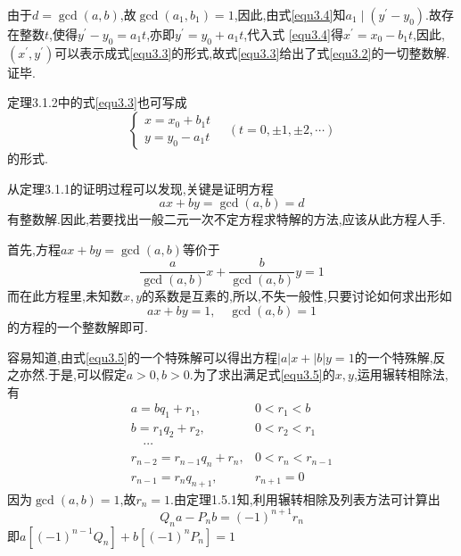 由于$d=\operatorname{gcd}(a, b)$,故$\operatorname{gcd}\left(a_{1}, b_{1}\right)=1$,因此,由式\eqref{equ3.4}知$a_{1} \mid\left(y^{\prime}-y_{0}\right)$.故存在整数$t$,使得$y^{\prime}-y_{0}=a_{1} t$,亦即$y^{\prime}=y_{0}+a_{1} t$,代入式 \eqref{equ3.4}得$x^{\prime}=x_{0}-b_{1} t$,因此,$\left(x^{\prime}, y^{\prime}\right)$可以表示成式\eqref{equ3.3}的形式,故式\eqref{equ3.3}给出了式\eqref{equ3.2}的一切整数解.证毕.

\remark 定理3.1.2中的式\eqref{equ3.3}也可写成
\begin{equation*}
	\begin{cases}
		x=x_{0}+b_{1} t \\
		y=y_{0}-a_{1} t
	\end{cases} \quad(t=0, \pm 1, \pm 2, \cdots)
\end{equation*}
的形式.

\entry 从定理3.1.1的证明过程可以发现,关键是证明方程
\begin{equation*}
	a x+b y=\operatorname{gcd}(a, b)=d
\end{equation*}
有整数解.因此,若要找出一般二元一次不定方程求特解的方法,应该从此方程人手.

首先,方程$a x+b y=\operatorname{gcd}(a, b)$等价于
\begin{equation*}
	\frac{a}{\operatorname{gcd}(a, b)} x+\frac{b}{\operatorname{gcd}(a, b)} y=1
\end{equation*}
而在此方程里,未知数$x, y$的系数是互素的,所以,不失一般性,只要讨论如何求出形如
\begin{equation}\label{equ3.5}
	a x+b y=1, \quad \operatorname{gcd}(a, b)=1
\end{equation}
的方程的一个整数解即可.

容易知道,由式\eqref{equ3.5}的一个特殊解可以得出方程$|a| x+|b| y=1$的一个特殊解,反之亦然.于是,可以假定$a>0, b>0$.为了求出满足式\eqref{equ3.5}的$x, y$,运用辗转相除法,有
\begin{equation*}
	\begin{array}{ll}
		a=b q_{1}+r_{1}, & 0<r_{1}<b \\
		b=r_{1} q_{2}+r_{2}, & 0<r_{2}<r_{1} \\
		\quad \cdots \\
		r_{n-2}=r_{n-1} q_{n}+r_{n}, & 0<r_{n}<r_{n-1} \\
		r_{n-1}=r_{n} q_{n+1}, & r_{n+1}=0
	\end{array}
\end{equation*}
因为$\operatorname{gcd}(a, b)=1$,故$r_{n}=1$.由定理1.5.1知,利用辗转相除及列表方法可计算出
\begin{equation*}
	Q_{n} a-P_{n} b=(-1)^{n+1} r_{n}
\end{equation*}
即$a\left[(-1)^{n-1} Q_{n}\right]+b\left[(-1)^{n} P_{n}\right]=1$

